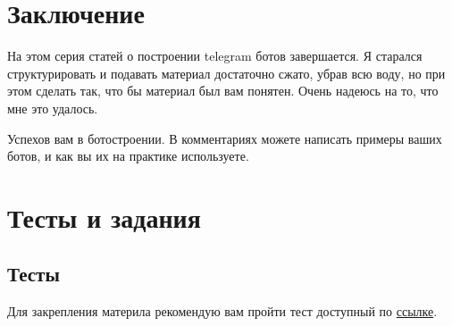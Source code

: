 \documentclass[
]{book}
\newenvironment{Shaded}{\begin{snugshade}}{\end{snugshade}}
\newcommand{\CommentTok}[1]{\textcolor[rgb]{0.56,0.35,0.01}{\textit{#1}}}
\newcommand{\FunctionTok}[1]{\textcolor[rgb]{0.00,0.00,0.00}{#1}}
\newcommand{\NormalTok}[1]{#1}
\newcommand{\OtherTok}[1]{\textcolor[rgb]{0.56,0.35,0.01}{#1}}
\newcommand{\SpecialCharTok}[1]{\textcolor[rgb]{0.00,0.00,0.00}{#1}}
\newcommand{\StringTok}[1]{\textcolor[rgb]{0.31,0.60,0.02}{#1}}
\begin{document}
\begin{Shaded}
\end{Shaded}

\hypertarget{ux437ux430ux43aux43bux44eux447ux435ux43dux438ux435-4}{%
\section{Заключение}\label{ux437ux430ux43aux43bux44eux447ux435ux43dux438ux435-4}}

На этом серия статей о построении telegram ботов завершается. Я старался структурировать и подавать материал достаточно сжато, убрав всю воду, но при этом сделать так, что бы материал был вам понятен. Очень надеюсь на то, что мне это удалось.

Успехов вам в ботостроении. В комментариях можете написать примеры ваших ботов, и как вы их на практике используете.

\hypertarget{ux442ux435ux441ux442ux44b-ux438-ux437ux430ux434ux430ux43dux438ux44f-4}{%
\section{Тесты и задания}\label{ux442ux435ux441ux442ux44b-ux438-ux437ux430ux434ux430ux43dux438ux44f-4}}

\hypertarget{ux442ux435ux441ux442ux44b-4}{%
\subsection{Тесты}\label{ux442ux435ux441ux442ux44b-4}}

Для закрепления материла рекомендую вам пройти тест доступный по \href{https://onlinetestpad.com/t/build-tg-bot-in-r-5}{ссылке}.
\end{document}
